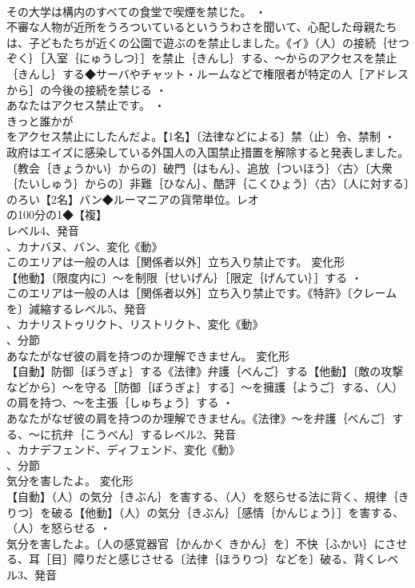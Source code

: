 \documentclass[8pt]{extreport}
\begin{document}
\begin{CJK}{UTF8}{min}
\\	その大学は構内のすべての食堂で喫煙を禁じた。 ・
\\	不審な人物が近所をうろついているといううわさを聞いて、心配した母親たちは、子どもたちが近くの公園で遊ぶのを禁止しました。《イ》（人）の接続｛せつぞく｝［入室｛にゅうしつ｝］を禁止｛きんし｝する、～からのアクセスを禁止｛きんし｝する◆サーバやチャット・ルームなどで権限者が特定の人［アドレスから］の今後の接続を禁じる ・
\\	あなたはアクセス禁止です。 ・
\\	きっと誰かが
\\	をアクセス禁止にしたんだよ。【1名】〔法律などによる〕禁（止）令、禁制 ・
\\	政府はエイズに感染している外国人の入国禁止措置を解除すると発表しました。〔教会｛きょうかい｝からの〕破門｛はもん｝、追放｛ついほう｝〈古〉〔大衆｛たいしゅう｝からの〕非難｛ひなん｝、酷評｛こくひょう｝〈古〉〔人に対する〕のろい【2名】バン◆ルーマニアの貨幣単位。レオ
\\	の100分の1◆【複】
\\	レベル4、発音
\\	、カナバヌ、バン、変化《動》
\\	このエリアは一般の人は［関係者以外］立ち入り禁止です。	変化形 
\\	【他動】〔限度内に〕～を制限｛せいげん｝［限定｛げんてい｝］する ・
\\	このエリアは一般の人は［関係者以外］立ち入り禁止です。《特許》〔クレームを〕減縮するレベル5、発音
\\	、カナリストゥリクト、リストリクト、変化《動》
\\	、分節
\\	あなたがなぜ彼の肩を持つのか理解できません。	変化形 
\\	【自動】防御｛ぼうぎょ｝する《法律》弁護｛べんご｝する【他動】〔敵の攻撃などから〕～を守る［防御｛ぼうぎょ｝する］～を擁護｛ようご｝する、（人）の肩を持つ、～を主張｛しゅちょう｝する ・
\\	あなたがなぜ彼の肩を持つのか理解できません。《法律》～を弁護｛べんご｝する、～に抗弁｛こうべん｝するレベル2、発音
\\	、カナデフェンド、ディフェンド、変化《動》
\\	、分節
\\	気分を害したよ。	変化形 
\\	【自動】（人）の気分｛きぶん｝を害する、（人）を怒らせる法に背く、規律｛きりつ｝を破る【他動】（人）の気分｛きぶん｝［感情｛かんじょう｝］を害する、（人）を怒らせる ・
\\	気分を害したよ。〔人の感覚器官｛かんかく きかん｝を〕不快｛ふかい｝にさせる、耳［目］障りだと感じさせる〔法律｛ほうりつ｝などを〕破る、背くレベル3、発音

\end{CJK}
\end{document}
